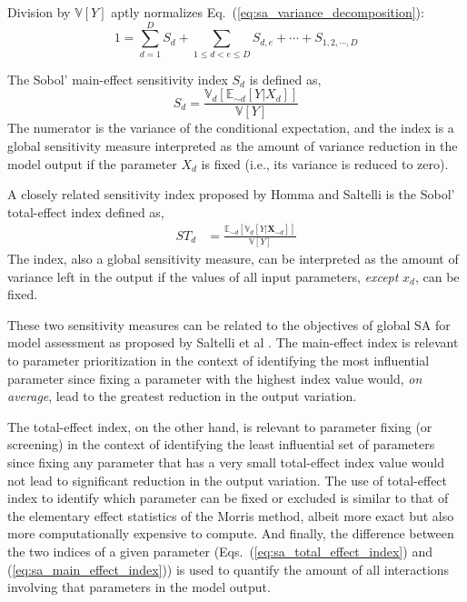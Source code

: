 Division by $\mathbb{V}[Y]$ aptly normalizes Eq.~(\ref{eq:sa_variance_decomposition}):
\begin{equation}
  1 = \sum_{d = 1}^{D} S_d + \sum_{1 \leq d < e \leq D} S_{d,e} + \cdots + S_{1,2,\cdots,D}
\label{eq:sa_normalized_variance}
\end{equation}

The Sobol' main-effect sensitivity index $S_d$ is defined as,
\begin{equation}
  S_d = \frac{\mathbb{V}_d [\mathbb{E}_{\sim d} [Y|X_d]]}{\mathbb{V}[Y]}
\label{eq:sa_main_effect_index}
\end{equation}
The numerator is the variance of the conditional expectation,
and the index is a global sensitivity measure interpreted as the amount of variance reduction in the model output if the parameter $X_d$ is fixed (i.e., its variance is reduced to zero).
\pagebreak

A closely related sensitivity index proposed by Homma and Saltelli \cite{Homma1996} is the Sobol' total-effect index defined as,
\begin{equation}
  \begin{split}
    ST_{d} & = \frac{\mathbb{E}_{\sim d}[\mathbb{V}_{d}[Y|\mathbf{X}_{\sim d}]]}{\mathbb{V}[Y]}
  \end{split}
\label{eq:sa_total_effect_index}
\end{equation}
The index, also a global sensitivity measure, can be interpreted as the amount of variance left in the output if the values of all input parameters, 
\emph{except} $x_d$, can be fixed.

These two sensitivity measures can be related to the objectives of global SA for model assessment as proposed by Saltelli et al \cite{Saltelli2004,Saltelli2008}.
The main-effect index is relevant to parameter prioritization in the context of identifying the most influential parameter 
since fixing a parameter with the highest index value would, \emph{on average}, lead to 
the greatest reduction in the output variation.

The total-effect index, on the other hand, is relevant to parameter fixing (or screening) in the context of identifying the least influential set of parameters since fixing any parameter that has a very small 
total-effect index value would not lead to significant reduction in the output variation.
The use of total-effect index to identify which parameter can be fixed or excluded is similar to that of the elementary effect statistics of the Morris method, 
albeit more exact but also more computationally expensive to compute.
And finally, the difference between the two indices of a given parameter (Eqs.~(\ref{eq:sa_total_effect_index}) and (\ref{eq:sa_main_effect_index})) is used to quantify the amount of all interactions involving that parameters in the model output.
